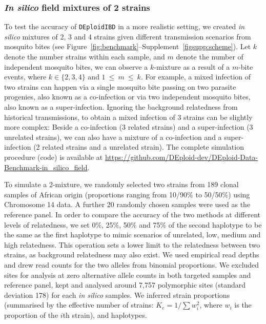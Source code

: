 \documentclass[9pt,lineno]{elife}
\begin{document}

\subsubsection{{\it In silico} field mixtures of 2 strains}

To test the accuracy of \texttt{DEploidIBD} in a more realistic setting, we created {\it in silico} mixtures of 2, 3 and 4 strains given different transmission scenarios from mosquito bites (see Figure~\ref{fig:benchmark}--Supplement~\ref*{figsupp:scheme}). Let $k$ denote the number strains within each sample, and $m$ denote the number of independent mosquito bites, we can observe a $k$-mixture as a result of a $m$-bite events, where $k \in \{2,3,4\}$ and $1~{\leq}~{m}~{\leq}~k$. For example, a mixed infection of two strains can happen via a single mosquito bite passing on two parasite progenies, also known as a co-infection or via two independent mosquito bites, also known as a super-infection. Ignoring the background relatedness from historical transmissions, to obtain a mixed infection of 3 strains can be slightly more complex: Beside a co-infection (3 related strains) and a super-infection (3 unrelated strains), we can also have a mixture of a co-infection and a super-infection (2 related strains and a unrelated strain). The complete simulation procedure (code) is available at \url{https://github.com/DEploid-dev/DEploid-Data-Benchmark-in_silico_field}.

To simulate a 2-mixture, we randomly selected two strains from 189 clonal samples of African origin (proportions ranging from 10/90\% to 50/50\%) using Chromosome 14 data.  A further 20 randomly chosen samples were used as the reference panel. In order to compare the accuracy of the two methods at different levels of relatedness, we set 0\%, 25\%, 50\% and 75\% of the second haplotype to be the same as the first haplotype to mimic scenarios of unrelated, low, medium and high relatedness. This operation sets a lower limit to the relatedness between two strains, as background relatedness may also exist. We used empirical read depths and drew read counts for the two alleles from binomial proportions.
We excluded sites for analysis at zero alternative allele counts in both targeted samples and reference panel, kept and analysed around 7,757 polymorphic sites (standard deviation 178) for each {\it in silico} samples.
We inferred strain proportions (summarised by the effective number of strains: $K_e = 1/\sum w_{i}^{2}$, where $w_i$ is the proportion of the $i$th strain), and haplotypes.
\end{document}

